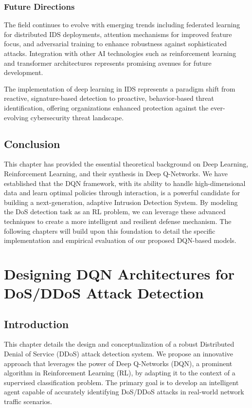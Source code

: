 \documentclass[16pt]{report}
\begin{document}
\subsection{Future Directions}
The field continues to evolve with emerging trends including federated learning for distributed IDS deployments, attention mechanisms for improved feature focus, and adversarial training to enhance robustness against sophisticated attacks. Integration with other AI technologies such as reinforcement learning and transformer architectures represents promising avenues for future development.

The implementation of deep learning in IDS represents a paradigm shift from reactive, signature-based detection to proactive, behavior-based threat identification, offering organizations enhanced protection against the ever-evolving cybersecurity threat landscape.

\section{Conclusion}
This chapter has provided the essential theoretical background on Deep Learning, Reinforcement Learning, and their synthesis in Deep Q-Networks. We have established that the DQN framework, with its ability to handle high-dimensional data and learn optimal policies through interaction, is a powerful candidate for building a next-generation, adaptive Intrusion Detection System. By modeling the DoS detection task as an RL problem, we can leverage these advanced techniques to create a more intelligent and resilient defense mechanism. The following chapters will build upon this foundation to detail the specific implementation and empirical evaluation of our proposed DQN-based models.

\chapter{Designing DQN Architectures for DoS/DDoS Attack Detection}
\section{Introduction}

This chapter details the design and conceptualization of a robust Distributed Denial of Service (DDoS) attack detection system. We propose an innovative approach that leverages the power of Deep Q-Networks (DQN), a prominent algorithm in Reinforcement Learning (RL), by adapting it to the context of a supervised classification problem. The primary goal is to develop an intelligent agent capable of accurately identifying DoS/DDoS attacks in real-world network traffic scenarios.
\end{document}
